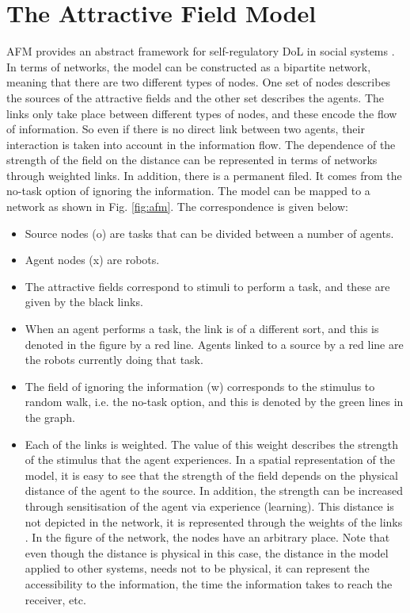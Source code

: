\documentclass{llncs}
\begin{document}
\section{The Attractive Field Model}
\label{sec:model}
AFM provides an abstract framework for self-regulatory DoL in social systems \cite{Elsa}. In terms of networks, the model can be constructed as a bipartite network, meaning that there are two different types of nodes. One set of nodes describes the sources of the attractive fields and the other set describes the agents. The links only take place between different types of nodes, and these encode the flow of information. So even if there is no direct link between two agents, their interaction is taken into account in the information flow. The dependence of the strength of the field on the distance can be represented in terms of networks through weighted links. In addition, there is a permanent filed. It comes from the no-task option of ignoring the information. The model can be mapped to a network as shown in Fig. \ref{fig:afm}. The correspondence is given below:
\begin{itemize}
\item Source nodes (o) are tasks that can be divided between a number of agents.
\item Agent nodes (x) are robots.
\item The attractive fields correspond to stimuli to perform a task, and these are given by the black links.
\item When an agent performs a task, the link is of a different sort, and this is denoted in the figure by a red line. Agents linked to a source by a red line are the robots currently doing that task. 
\item The field of ignoring the information (w) corresponds to the stimulus to random walk, i.e. the no-task option, and this is denoted by the green lines in the graph. 
\item Each of the links is weighted. The value of this weight describes the strength of the stimulus that the agent experiences. In a spatial representation of the model, it is easy to see that the strength of the field depends on the physical distance of the agent to the source. In addition, the strength can be increased through sensitisation of the agent via experience (learning). This distance is not depicted in the network, it is represented through the weights of the links . In the figure of the network, the nodes have an arbitrary place. Note that even though the distance is physical in this case, the distance in the model applied to other systems, needs not to be physical, it can represent the accessibility to the information, the time the information takes to reach the receiver, etc. 
\end{itemize}
\end{document}
